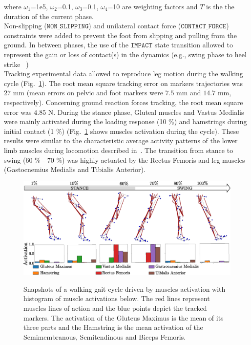 \noindent where $\omega_1$=1e5, $\omega_2$=0.1, $\omega_3$=0.1, $\omega_4$=10 are  weighting factors and $T$ is the the duration of the current phase.\\

Non-slipping ($\mathtt{NON\_SLIPPING}$) and unilateral contact force ($\mathtt{CONTACT\_FORCE}$) constraints were added to prevent the foot from slipping and pulling from the ground. 
In between phases, the use of the $\mathtt{IMPACT}$ state transition allowed to represent the gain or loss of contact(s) in the dynamics (e.g., swing phase to heel strike ~\cite{felis_synthesis_2016}) \\

Tracking experimental data allowed to reproduce leg motion during the walking cycle (Fig.~\ref{fig:snapshots_multiphase_walking_cycle}). 
The root mean square tracking error on markers trajectories was $27$ mm (mean errors on pelvic and foot markers were $7.5$ mm and $14.7$ mm, respectively). 
Concerning ground reaction forces tracking, the root mean square error was $4.85$ N.
During the stance phase, Gluteal muscles and Vastus Medialis were mainly activated during the loading response (10 \%) and hamstrings during initial contact (1 \%) (Fig.~\ref{fig:snapshots_multiphase_walking_cycle} shows muscles activation during the cycle). 
These results were similar to the characteristic average activity patterns of the lower limb muscles during locomotion described in~\cite{winter_biomechanics_1991}. 
The transition from stance to swing (60 \% - 70 \%) was highly actuated by the Rectus Femoris and leg muscles (Gastocnemius Medialis and Tibialis Anterior). 

\begin{figure}[t!]
\centering
\includegraphics[width=\textwidth]{figures/multiphase_walking_cycle.eps}\\
\caption{Snapshots of a walking gait cycle driven by muscles activation with histogram of muscle activations below. The red lines represent muscles lines of action and the blue points depict the tracked markers. The activation of the Gluteus Maximus is the mean of its three parts and the Hamstring is the mean activation of the Semimembranous, Semitendinous and Biceps Femoris. }
\label{fig:snapshots_multiphase_walking_cycle}
\end{figure}

